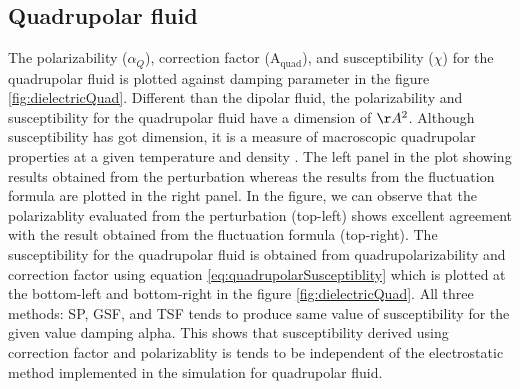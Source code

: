 \subsection{Quadrupolar fluid}
The polarizability ($\alpha_Q$), correction factor ($\mathrm{A_{quad}}$), and susceptibility ($\chi$) for the quadrupolar fluid is plotted against damping parameter in the figure \ref{fig:dielectricQuad}. Different than the dipolar fluid, the polarizability and susceptibility for the quadrupolar fluid have a dimension of $\AA ^2$. Although susceptibility has got dimension, it is a measure of macroscopic quadrupolar properties at a given temperature and density \cite{JeonI03, JeonII03}. The left panel in the plot showing results obtained from  the perturbation whereas the results from the fluctuation formula are plotted in the right panel. In the figure, we can observe that the polarizablity evaluated from the perturbation (top-left) shows excellent agreement with the result obtained from the fluctuation formula (top-right). The susceptibility for the quadrupolar fluid is obtained from quadrupolarizability and correction factor using equation \ref{eq:quadrupolarSusceptiblity} which is plotted at the bottom-left and bottom-right in the figure \ref{fig:dielectricQuad}. All three methods: SP, GSF, and TSF tends to produce same value of susceptibility for the given value damping alpha. This shows that susceptibility derived using correction factor and polarizablity is tends to be independent of the electrostatic method implemented in the simulation for quadrupolar fluid.

